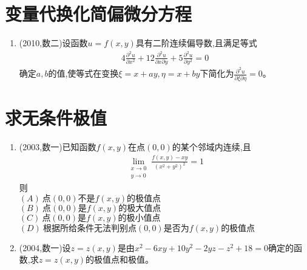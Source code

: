 \documentclass[12pt, a4paper, oneside, UTF8]{ctexbook}
\begin{document}
\section{变量代换化简偏微分方程}

\begin{enumerate}[label=\arabic*.,start=8]
    \item (2010,数二)设函数$u=f(x,y)$具有二阶连续偏导数,且满足等式
    \begin{align*}
        4\frac{\partial^2 u}{\partial x^2}+12\frac{\partial^2 u}{\partial x\partial y}+5\frac{\partial^2 u}{\partial y^2}=0
    \end{align*}
    确定$a,b$的值,使等式在变换$\xi=x+ay,\eta=x+by$下简化为$\frac{\partial^2 u}{\partial \xi\partial \eta}=0$。
    
    \begin{solution}
    \newpage
    \end{solution}
\end{enumerate}

\section{求无条件极值}

\begin{enumerate}[label=\arabic*.,start=9]
    \item (2003,数一)已知函数$f(x,y)$在点$(0,0)$的某个邻域内连续,且
    \begin{align*}
        \lim_{\substack{x\to 0\\ y\to 0}}\frac{f(x,y)-xy}{(x^2+y^2)^2}=1
    \end{align*}
    则 \\
    $(A)\ \text{点}(0,0)\text{不是}f(x,y)\text{的极值点}$ \\
    $(B)\ \text{点}(0,0)\text{是}f(x,y)\text{的极大值点}$ \\
    $(C)\ \text{点}(0,0)\text{是}f(x,y)\text{的极小值点}$ \\
    $(D)\ \text{根据所给条件无法判别点}(0,0)\text{是否为}f(x,y)\text{的极值点}$
    
    \begin{solution}
    \newpage
    \end{solution}
    
    \item (2004,数一)设$z=z(x,y)$是由$x^2-6xy+10y^2-2yz-z^2+18=0$确定的函数,求$z=z(x,y)$的极值点和极值。
    
    \begin{solution}
    \newpage
    \end{solution}
\end{enumerate}
\end{document}
